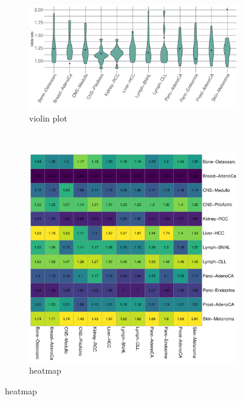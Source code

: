 \begin{figure}[htbp]
    \begin{subfigure}{\textwidth}
    \centering
    \includegraphics[scale=0.55]{graphics/mixed_or_violin.pdf}
    \caption{violin plot}
    \label{fig:mixed_or_violin}
    \end{subfigure} \\
    
    \vspace{0.2cm}
    \begin{subfigure}{\textwidth}
    \centering
    \includegraphics[scale=0.5]{graphics/mixed_or_heatmap.pdf}
    \caption{heatmap}
    \label{fig:mixed_or_heatmap}
    \end{subfigure} 


\end{figure}
